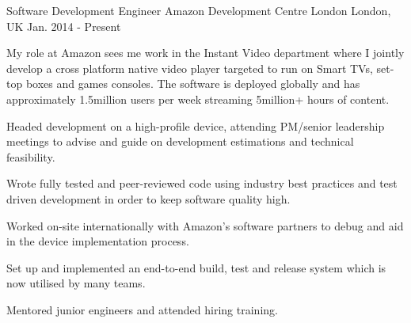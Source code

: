 
\begin{cventries}

  \cventry
    {Software Development Engineer} %
    {Amazon Development Centre London} %
    {London, UK} %
    {Jan. 2014 - Present} %
    {
      \begin{cventrysummary}
      My role at Amazon sees me work in the Instant Video department where I jointly
      develop a cross platform native video player targeted to run on Smart TVs,
      set-top boxes and games consoles. The software is deployed globally and
      has approximately 1.5million users per week streaming 5million+ hours of
      content.
      \end{cventrysummary}
      \begin{cvitems} %
        \item {Headed development on a high-profile device, attending PM/senior leadership meetings to advise and guide on development estimations and technical feasibility.}
        \item {Wrote fully tested and peer-reviewed code using industry best practices and test driven development in order to keep software quality high.}
        \item {Worked on-site internationally with Amazon’s software partners to debug and aid in the device implementation process.}
        \item {Set up and implemented an end-to-end build, test and release system which is now utilised by many teams.}
        \item {Mentored junior engineers and attended hiring training.}
      \end{cvitems}
    }


\end{cventries}
